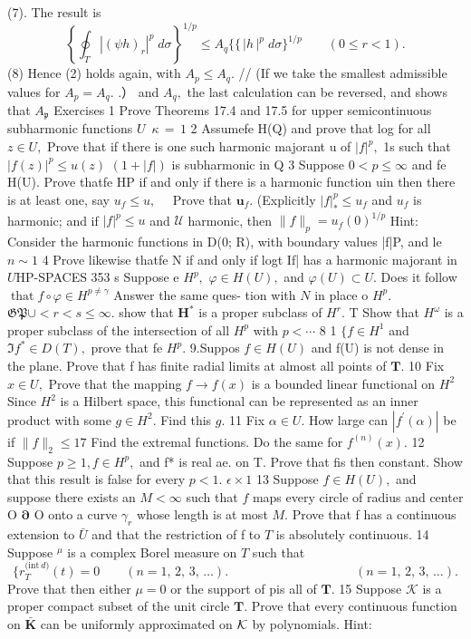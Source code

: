 (7). The result is $$ \left\{\oint_{T}|(\psi h)_{r}|^{p}\;d\sigma\right\}^{1/p}\leq A_{q}\biggl\{ \{\frac{}{}|h\,|^{p}\;d\sigma\biggr\}^{1/p}\qquad(0\leq r<1). $$ (8) Hence (2) holds again, with $A_{p}\leq A_{q}.$ // (If we take the smallest admissible values for $A_{p}=A_{q}.$ .） and $A_{q},$ the last calculation can be reversed, and shows that $A_{\mathfrak{p}}$ Exercises 1 Prove Theorems 17.4 and 17.5 for upper semicontinuous subharmonic functions $\boldsymbol{\mathit{U}}$ $\,\kappa\,=\,1$ 2 Assumefe H(Q) and prove that log for all $z\in U,$ Prove that if there is one such harmonic majorant u of $|f|^{p},$ 1s such that $|f(z)|^{p}\leq u(z)$ $(1+|f|)$ is subharmonic in Q 3 Suppose $0<p\leq\infty$ and fe H(U). Prove thatfe HP if and only if there is a harmonic function uin then there is at least one, say $u_{f}\leq u,\quad$ Prove that ${\boldsymbol{u}}_{f}.$ (Explicitly $|f|_{*}^{p}\leq u_{f}$ and $u_{f}$ is harmonic; and if $|f|^{p}\leq u$ and ${\mathcal{U}}$ harmonic, then $\|f\|_{p}=u_{f}(0)^{1/p}$ Hint: Consider the harmonic functions in D(0; R), with boundary values |f|P, and le $\scriptstyle n\sim1$ 4 Prove likewise thatfe N if and only if logt If| has a harmonic majorant in $\boldsymbol{\mathit{U}}$HP-SPACES 353 s Suppose e $H^{p},$ $\varphi\in H(U),$ and $\varphi(U)\subset U.$ Does it follow $\operatorname{that}f\circ\varphi\in H^{p\neq\gamma}$ Answer the same ques- tion with ${\mathbf{}}N$ in place o $H^{p}.$ ${\mathfrak{G P}}\cup<r<s\leq\infty.$ show that ${\boldsymbol{H}}^{*}$ is a proper subclass of $H^{r}.$ T Show that $H^{\omega}$ is a proper subclass of the intersection of all $H^{p}$ with $p<\cdots$ 8 1 $\{f\in H^{1}$ and $\Im f^{*}\in D(T),$ prove that fe $H^{p}.$ 9.Suppos $f\in H(U)$ and f(U) is not dense in the plane. Prove that f has finite radial limits at almost all points of ${\boldsymbol{T}}.$ 10 Fix $x\in U,$ Prove that the mapping $f\to f(x)$ is a bounded linear functional on ${\textstyle H}^{2}$ Since $H^{2}$ is a Hilbert space, this functional can be represented as an inner product with some $g\in H^{2}.$ Find this $g.$ 11 Fix $\alpha\in U.$ How large can $|f^{\prime}(\alpha)|$ be if $\|f\|_{2}\leq17$ Find the extremal functions. Do the same for $f^{(n)}(x).$ 12 Suppose $p\geq1,f\in H^{p},$ and f* is real ae. on T. Prove that fis then constant. Show that this result is false for every $p<1.$ $\textstyle{\mathit{\epsilon}}\times{\mathit{1}}$ 13 Suppose $f\in H(U),$ and suppose there exists an $M<\infty$ such that $\boldsymbol{\mathit{f}}$ maps every circle of radius and center O $\mathbf{\partial}$ O onto a curve $\gamma_{r}$ whose length is at most $M.$ Prove that f has a continuous extension to $\bar{U}$ and that the restriction of f to ${\mathbf{}}T$ is absolutely continuous. 14 Suppose ${}^{\mu}$ is a complex Borel measure on ${\mathbf{}}T$ such that $$ \{r_{T}^{\mathrm{(int}\ d)}(t)=0\qquad(n=1,\,2,\,3,\,\ldots).\qquad\qquad\qquad\qquad\qquad(n=1,\,2,\,3,\,\ldots). $$ Prove that then either $\mu=0$ or the support of pis all of ${\boldsymbol{T}}.$ 15 Suppose $\scriptstyle{\mathcal{K}}$ is a proper compact subset of the unit circle ${\boldsymbol{T}}.$ Prove that every continuous function on ${\bar{\boldsymbol{K}}}$ can be uniformly approximated on ${\cal K}$ by polynomials. Hint: 
